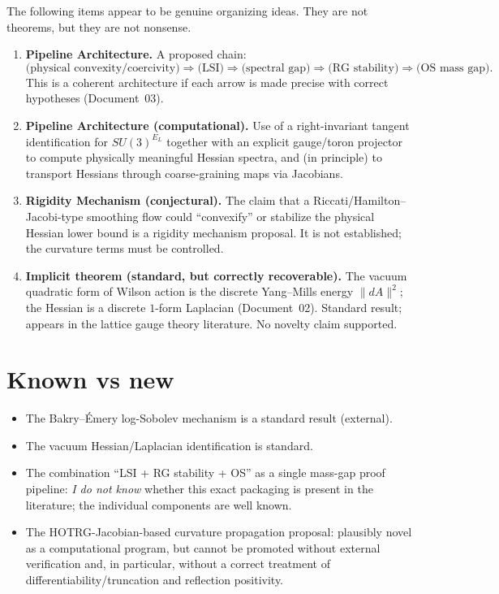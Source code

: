 \documentclass[11pt]{article}
\begin{document}
The following items appear to be genuine organizing ideas.
They are not theorems, but they are not nonsense.

\begin{enumerate}[leftmargin=*]
\item \textbf{Pipeline Architecture.}
A proposed chain:
\[
\text{(physical convexity/coercivity)} \Rightarrow \text{(LSI)} \Rightarrow \text{(spectral gap)} \Rightarrow \text{(RG stability)} \Rightarrow \text{(OS mass gap)}.
\]
This is a coherent architecture if each arrow is made precise with correct hypotheses (Document~03).

\item \textbf{Pipeline Architecture (computational).}
Use of a right-invariant tangent identification for $SU(3)^{E_L}$ together with an explicit gauge/toron projector to compute physically meaningful Hessian spectra, and (in principle) to transport Hessians through coarse-graining maps via Jacobians.

\item \textbf{Rigidity Mechanism (conjectural).}
The claim that a Riccati/Hamilton--Jacobi-type smoothing flow could ``convexify'' or stabilize the physical Hessian lower bound is a rigidity mechanism proposal.
It is not established; the curvature terms must be controlled.

\item \textbf{Implicit theorem (standard, but correctly recoverable).}
The vacuum quadratic form of Wilson action is the discrete Yang--Mills energy $\|dA\|^2$; the Hessian is a discrete $1$-form Laplacian (Document~02).
Standard result; appears in the lattice gauge theory literature.  No novelty claim supported.
\end{enumerate}

\section{Known vs new}

\begin{itemize}[leftmargin=*]
\item The Bakry--\'Emery log-Sobolev mechanism is a standard result (external).
\item The vacuum Hessian/Laplacian identification is standard.
\item The combination ``LSI + RG stability + OS'' as a single mass-gap proof pipeline:
\emph{I do not know} whether this exact packaging is present in the literature; the individual components are well known.
\item The HOTRG-Jacobian-based curvature propagation proposal:
plausibly novel as a computational program, but cannot be promoted without external verification and, in particular, without a correct treatment of differentiability/truncation and reflection positivity.
\end{itemize}
\end{document}
